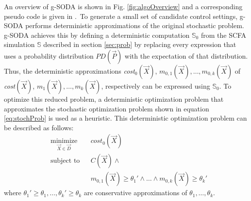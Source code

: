 \documentclass[a4paper, 12pt]{article} %
\begin{document}
An overview of g-SODA is shown in Fig. \ref{fig:algoOverview} and a corresponding pseudo code is given in \algoSODAm.~To generate a small set of candidate control settings, g-SODA performs deterministic approximations of the original stochastic problem. 
g-SODA achieves this by defining a deterministic computation $\mathbb{S}_0$ from the SCFA simulation $\mathbb{S}$ described in section \ref{sec:prob} by replacing every expression that uses a probability distribution $PD(\vec{P})$ with the expectation of that distribution. 
Thus, the deterministic approximations \textit{cost$_0$}$(\vec{X})$, $m_{0,1}(\vec{X}),\dots,m_{0,k}(\vec{X})$ of \textit{cost}$(\vec{X})$, $m_1(\vec{X}),\dots,m_k(\vec{X})$, respectively can be expressed using $\mathbb{S}_0$.
To optimize this reduced problem, a deterministic optimization problem that approximates the stochastic optimization problem shown in equation \ref{eq:stochProb} is used as a heuristic. This deterministic optimization problem can be described as follows:
\begin{equation}
\label{eq:detApprox}
\begin{aligned}
& \underset{\vec{X}\in\vec{D}}{\text{minimize}}
& & \textit{cost}_0(\vec{X}) \\
& \text{subject to}
& & C(\vec{X}) \wedge \\
&&& m_{0,1}(\vec{X})\ge  \theta_1{'}\wedge\dots \wedge m_{0,k}(\vec{X})\ge  \theta_k{'} 
\end{aligned}
\end{equation}
where $\theta_1{'} \ge \theta_1,\dots,\theta_k{'} \ge \theta_k$ are conservative approximations of $\theta_1,\dots,\theta_k$. 
\end{document}
